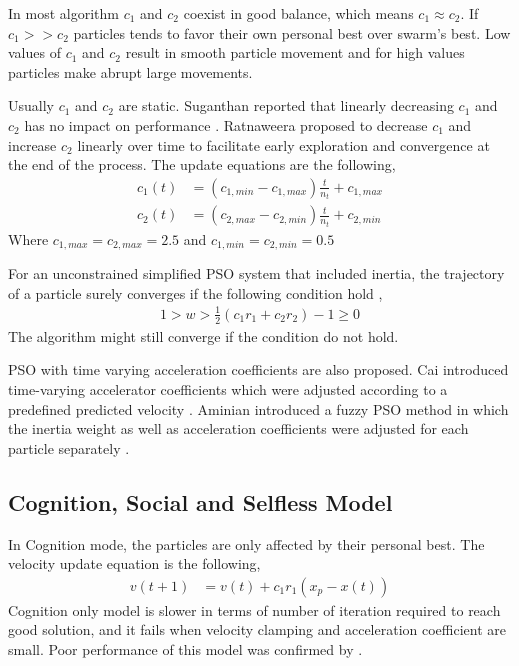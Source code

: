\documentclass{article}
\begin{document}
In most algorithm $c_1$ and $c_2$ coexist in good balance, which means $c_1 \approx c_2$. If $c_1 >> c_2$ particles tends to favor their own personal best over swarm's best. Low values of $c_1$ and $c_2$ result in smooth particle movement and for high values particles make abrupt large movements.

Usually $c_1$ and $c_2$ are static. Suganthan reported that linearly decreasing $c_1$ and $c_2$ has no impact on performance \cite{suganthan1999particle}. Ratnaweera proposed to decrease $c_1$ and increase $c_2$ linearly over time to facilitate early exploration and convergence at the end of the process. The update equations are the following,
\begin{align*}
c_1(t) &=  (c_{1,min} - c_{1, max}) \frac{t}{n_t} + c_{1, max} \\
c_2(t) &=  (c_{2,max} - c_{2, min}) \frac{t}{n_t} + c_{2, min} 
\end{align*}
Where $c_{1, max} = c_{2, max} = 2.5$ and $c_{1, min} = c_{2,min} = 0.5$

For an unconstrained simplified PSO system that included inertia, the trajectory of a particle surely converges if the following condition hold \cite{trelea2003particle},
\begin{align*}
1 > w > \frac{1}{2}(c_1 r_1 + c_2 r_2) -1 \ge 0
\end{align*}
The algorithm might still converge if the condition do not hold.

PSO with time varying acceleration coefficients are also proposed. Cai  introduced  time-varying accelerator coefficients which were adjusted according to a predefined predicted velocity \cite{cai2009predicted}. Aminian introduced a fuzzy PSO method in which the inertia weight as well as acceleration coefficients were adjusted for each particle separately \cite{aminian2013novel}.






\subsection{Cognition, Social and Selfless Model}
In Cognition mode, the particles are only affected by their personal best. The velocity update equation is the following,
\begin{align*}
v(t+1) &= v(t) + c_1r_1(x_p - x(t))
\end{align*}
Cognition only model is slower in terms of number of iteration required to reach good solution, and it fails when velocity clamping and acceleration coefficient are small. Poor performance of this model was confirmed by  \cite{carlisle2000adapting}.
\end{document}
